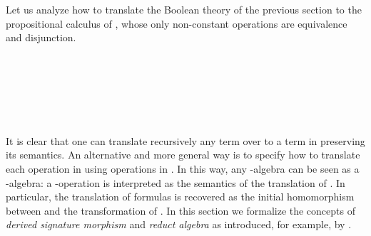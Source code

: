 Let us analyze how to translate the Boolean theory of the previous
section to the propositional calculus of \cite{dijkstra-scholten},
whose only non-constant operations are equivalence and disjunction.
\begin{code}
\>[0]\AgdaSpace{}%
\AgdaSpace{}%
\AgdaSymbol{:}\AgdaSpace{}%
\AgdaSpace{}%
\AgdaSpace{}%
\AgdaSpace{}%
\AgdaSpace{}%
\AgdaSpace{}%
\AgdaSpace{}%
\<%
\\
\>[0][@{}l@{\AgdaIndent{0}}]%
\>[2]\AgdaSpace{}%
%
\>[14]\AgdaSymbol{:}\AgdaSpace{}%
\AgdaSpace{}%
\AgdaSymbol{(}\AgdaInductiveConstructor{[]}\AgdaSpace{}%
\AgdaSpace{}%
\AgdaSymbol{)}\<%
\\
%
\>[2]\AgdaSpace{}%
%
\>[14]\AgdaSymbol{:}\AgdaSpace{}%
\AgdaSpace{}%
\AgdaSymbol{((}\AgdaSpace{}%
\AgdaSpace{}%
\AgdaOperator{\AgdaFunction{[}}\AgdaSpace{}%
\AgdaSpace{}%
\AgdaOperator{\AgdaFunction{]}}\AgdaSymbol{)}\AgdaSpace{}%
\AgdaSpace{}%
\AgdaSymbol{)}\<%
\\
\\[\AgdaEmptyExtraSkip]%
\>[0]\AgdaSpace{}%
\AgdaSymbol{:}\AgdaSpace{}%
\<%
\\
\>[0]\AgdaSpace{}%
\AgdaSymbol{=}\AgdaSpace{}%
\AgdaSpace{}%
\AgdaSymbol{\{}\AgdaSpace{}%
\AgdaSpace{}%
\AgdaSymbol{=}\AgdaSpace{}%
\AgdaSpace{}%
\AgdaSymbol{;}\AgdaSpace{}%
\AgdaSpace{}%
\AgdaSymbol{=}\AgdaSpace{}%
\AgdaSpace{}%
\AgdaSymbol{\}}\<%
\end{code}

It is clear that one can translate recursively any term over
 to a term in 
preserving its semantics. %
An alternative and more general way is to specify how to translate
each operation in  using operations in
. In this way, any
-algebra can be seen as a
-algebra: a
-operation  is interpreted as
the semantics of the translation of . In particular,
the translation of formulas is recovered as the initial
homomorphism between
\AgdaSpace{} and the
transformation of
\AgdaSpace{}. In this
section we formalize the concepts of \emph{derived signature
  morphism} and \emph{reduct algebra} as introduced, for example,
by \cite{sannella2012foundations}.


